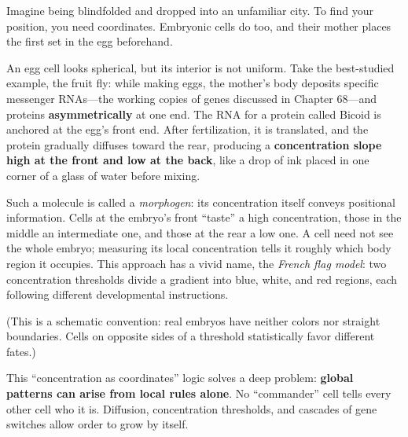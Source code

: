 Imagine being blindfolded and dropped into an unfamiliar city. To find your position, you need coordinates. Embryonic cells do too, and their mother places the first set in the egg beforehand.

An egg cell looks spherical, but its interior is not uniform. Take the best-studied example, the fruit fly: while making eggs, the mother's body deposits specific messenger RNAs---the working copies of genes discussed in Chapter 68---and proteins \textbf{asymmetrically} at one end. The RNA for a protein called Bicoid is anchored at the egg's front end. After fertilization, it is translated, and the protein gradually diffuses toward the rear, producing a \textbf{concentration slope high at the front and low at the back}, like a drop of ink placed in one corner of a glass of water before mixing.

Such a molecule is called a \emph{morphogen}: its concentration itself conveys positional information. Cells at the embryo's front ``taste'' a high concentration, those in the middle an intermediate one, and those at the rear a low one. A cell need not see the whole embryo; measuring its local concentration tells it roughly which body region it occupies. This approach has a vivid name, the \emph{French flag model}: two concentration thresholds divide a gradient into blue, white, and red regions, each following different developmental instructions.

\begin{center}
\end{center}

(This is a schematic convention: real embryos have neither colors nor straight boundaries. Cells on opposite sides of a threshold statistically favor different fates.)

This ``concentration as coordinates'' logic solves a deep problem: \textbf{global patterns can arise from local rules alone}. No ``commander'' cell tells every other cell who it is. Diffusion, concentration thresholds, and cascades of gene switches allow order to grow by itself.

